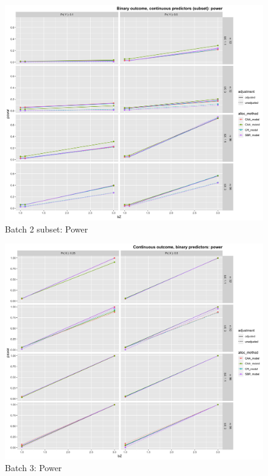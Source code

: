 \begin{figure}[H]
	\includegraphics[width=\linewidth]{figures/b2_sub_power_all_methods_adj_unadj}
	\caption{Batch 2 subset: Power}
	\label{fig:b2sp}
\end{figure}

\begin{figure}[H]
	\includegraphics[width=\linewidth]{figures/b3_power_all_methods_adj_unadj}
	\caption{Batch 3: Power}
	\label{fig:b3p}
\end{figure}

